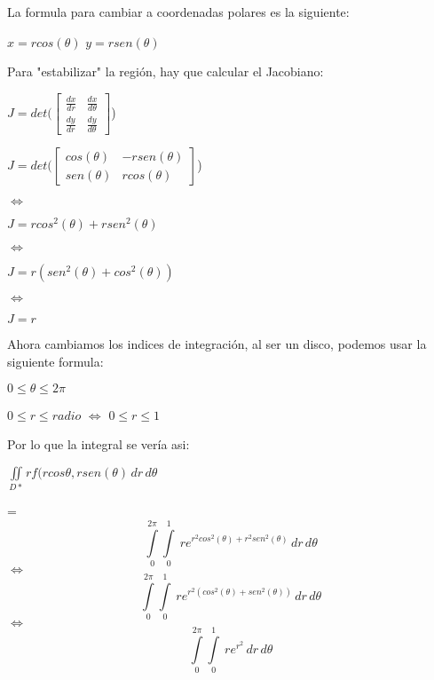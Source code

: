 \noindent La formula para cambiar a coordenadas polares es la siguiente:
\begin{center}
    $x=rcos(\theta)$     $y=rsen(\theta)$
\end{center}

\noindent Para "estabilizar" la región, hay que calcular el Jacobiano:
\begin{center}
    $J = det(\begin{bmatrix}
        \frac{dx}{dr} & \frac{dx}{d\theta} \\
        \frac{dy}{dr} & \frac{dy}{d\theta}
    \end{bmatrix}$)
    \vspace{6pt}

    $J = det(\begin{bmatrix}
        cos(\theta) & -rsen(\theta) \\
        sen(\theta) & rcos(\theta)
    \end{bmatrix}$)
    \vspace{6pt}
    
    $\iff$ 
    
    $J = rcos^2(\theta) + rsen^2(\theta)$
    \vspace{6pt}
    
    $\iff$
    
    $J = r(sen^2(\theta)+cos^2(\theta))$
    \vspace{6pt}
    
    $\iff$ 
    \vspace{6pt}
    
    $J = r$
\end{center}

\noindent Ahora cambiamos los indices de integración, al ser un disco, podemos usar la siguiente formula:
\begin{center}
    $0 \leq \theta \leq 2\pi$
    \vspace{6pt}

    $0 \leq r \leq radio$ $\iff$ $0 \leq r \leq 1$
\end{center}

\noindent Por lo que la integral se vería asi:
    \begin{center}
        $\displaystyle\iint\limits_{D*} rf(rcos\theta,rsen(\theta) \, dr \, d\theta$

        =
        \[\displaystyle\int\limits_0^{2\pi} \!\!\int\limits_0^1 \ re^{r^2cos^2(\theta) + r^2sen^2(\theta)} \, dr \, d\theta\]
        $\iff$
        \[\displaystyle\int\limits_0^{2\pi} \!\!\int\limits_0^1 \ re^{r^2(cos^2(\theta) + sen^2(\theta))} \, dr \, d\theta\]
        $\iff$
        \[\displaystyle\int\limits_0^{2\pi} \!\!\int\limits_0^1 \ re^{r^2} \, dr \, d\theta\]
    \end{center} 


